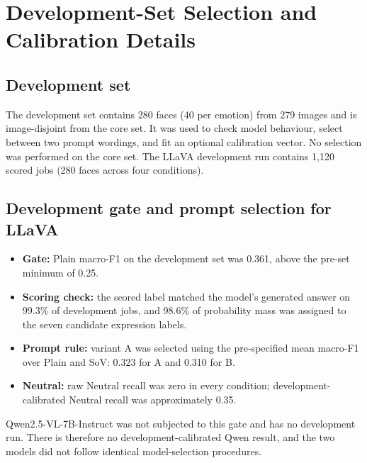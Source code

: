 \documentclass[lettersize,journal]{IEEEtran}
\begin{document}
\section{Development-Set Selection and Calibration Details}
\label{app:dev}
\subsection{Development set}
The development set contains 280 faces (40 per emotion) from 279 images and is image-disjoint from the core set. It was used to check model behaviour, select between two prompt wordings, and fit an optional calibration vector. No selection was performed on the core set. The LLaVA development run contains 1,120 scored jobs (280 faces across four conditions).

\subsection{Development gate and prompt selection for LLaVA}
\begin{itemize}
\item \textbf{Gate:} Plain macro-F1 on the development set was 0.361, above the pre-set minimum of 0.25.
\item \textbf{Scoring check:} the scored label matched the model's generated answer on 99.3\% of development jobs, and 98.6\% of probability mass was assigned to the seven candidate expression labels.
\item \textbf{Prompt rule:} variant A was selected using the pre-specified mean macro-F1 over Plain and SoV: 0.323 for A and 0.310 for B.
\item \textbf{Neutral:} raw Neutral recall was zero in every condition; development-calibrated Neutral recall was approximately 0.35.
\end{itemize}
Qwen2.5-VL-7B-Instruct was not subjected to this gate and has no development run. There is therefore no development-calibrated Qwen result, and the two models did not follow identical model-selection procedures.
\end{document}
